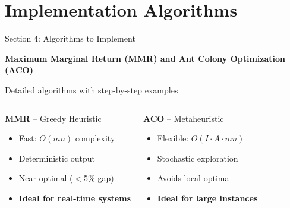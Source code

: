 \documentclass[aspectratio=43,8pt]{beamer}
\begin{document}
\section{Implementation Algorithms}

\begin{frame}{Section 4: Algorithms to Implement}
\begin{center}
{\Large\textcolor{primaryblue}{\textbf{Maximum Marginal Return (MMR) and Ant Colony Optimization (ACO)}}}

\vspace{0.3cm}
{\normalsize Detailed algorithms with step-by-step examples}
\end{center}

\vspace{0.2cm}
\begin{columns}[t]
\begin{block}{\textbf{MMR} -- Greedy Heuristic}
\begin{itemize}
    \item Fast: $O(mn)$ complexity
    \item Deterministic output
    \item Near-optimal ($<$5\% gap)
    \item \textbf{Ideal for real-time systems}
\end{itemize}
\end{block}

\begin{alertblock}{\textbf{ACO} -- Metaheuristic}
\begin{itemize}
    \item Flexible: $O(I \cdot A \cdot mn)$
    \item Stochastic exploration
    \item Avoids local optima
    \item \textbf{Ideal for large instances}
\end{itemize}
\end{alertblock}
\end{columns}
\end{frame}
\end{document}
